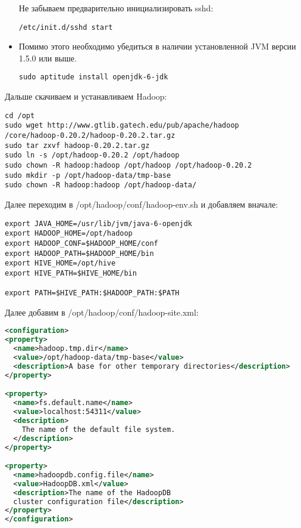 \begin{itemize}
Не забываем предварительно инициализировать sshd:
\begin{lstlisting}[label=lst:haddop6,caption=Запуск sshd]
/etc/init.d/sshd start
\end{lstlisting}

\item Помимо этого необходимо убедиться в наличии установленной JVM версии 1.5.0 или выше.
\begin{lstlisting}[label=lst:haddop7,caption=Устанавливаем JVM]
sudo aptitude install openjdk-6-jdk
\end{lstlisting}
\end{itemize}

Дальше скачиваем и устанавливаем Hadoop:
\begin{lstlisting}[label=lst:haddop8,caption=Устанавливаем Hadoop]
cd /opt
sudo wget http://www.gtlib.gatech.edu/pub/apache/hadoop
/core/hadoop-0.20.2/hadoop-0.20.2.tar.gz
sudo tar zxvf hadoop-0.20.2.tar.gz
sudo ln -s /opt/hadoop-0.20.2 /opt/hadoop
sudo chown -R hadoop:hadoop /opt/hadoop /opt/hadoop-0.20.2
sudo mkdir -p /opt/hadoop-data/tmp-base
sudo chown -R hadoop:hadoop /opt/hadoop-data/
\end{lstlisting}

Далее переходим в /opt/hadoop/conf/hadoop-env.sh и добавляем вначале:
\begin{lstlisting}[label=lst:haddop9,caption=Указываем переменные окружения]
export JAVA_HOME=/usr/lib/jvm/java-6-openjdk
export HADOOP_HOME=/opt/hadoop
export HADOOP_CONF=$HADOOP_HOME/conf
export HADOOP_PATH=$HADOOP_HOME/bin
export HIVE_HOME=/opt/hive
export HIVE_PATH=$HIVE_HOME/bin

export PATH=$HIVE_PATH:$HADOOP_PATH:$PATH
\end{lstlisting}

Далее добавим в /opt/hadoop/conf/hadoop-site.xml:
\begin{lstlisting}[language=XML,label=lst:haddop10,caption=Настройки hadoop]
<configuration>
<property>
  <name>hadoop.tmp.dir</name>
  <value>/opt/hadoop-data/tmp-base</value>
  <description>A base for other temporary directories</description>
</property>

<property>
  <name>fs.default.name</name>
  <value>localhost:54311</value>
  <description>
    The name of the default file system.
  </description>
</property>

<property>
  <name>hadoopdb.config.file</name>
  <value>HadoopDB.xml</value>
  <description>The name of the HadoopDB 
  cluster configuration file</description>
</property>
</configuration>
\end{lstlisting}

